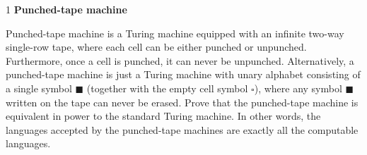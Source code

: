\documentclass[12pt]{article}
\begin{document}


\begin{problem}{1} \textbf{Punched-tape machine}

    Punched-tape machine is a Turing machine equipped with an infinite two-way single-row tape, where each cell can be either punched or unpunched. Furthermore, once a cell is punched, it can never be unpunched. Alternatively, a punched-tape machine is just a Turing machine with unary alphabet consisting of a single symbol $\blacksquare$ (together with the empty cell symbol $\square$), where any symbol $\blacksquare$  written on the tape can never be erased. Prove that the punched-tape machine is equivalent in power to the standard Turing machine. In other words, the languages accepted by the punched-tape machines are exactly all the computable languages.
\end{problem}
\end{document}

